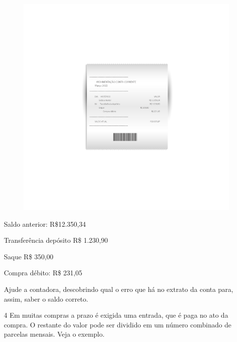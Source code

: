 \begin{figure}[htpb!]
\includegraphics[width=\textwidth]{../ilustracoes/MAT5/SAEB_5ANO_MAT_figura49.png}
\end{figure}

Saldo anterior: R\$12.350,34

Transferência depósito R\$ 1.230,90

Saque R\$ 350,00

Compra débito: R\$ 231,05

Ajude a contadora, descobrindo qual o erro que há no extrato da conta para, assim, saber o saldo correto.



\num{4} Em muitas compras a prazo é exigida uma entrada, que é paga no ato
da compra. O restante do valor pode ser dividido em um número combinado
de parcelas mensais. Veja o exemplo.

